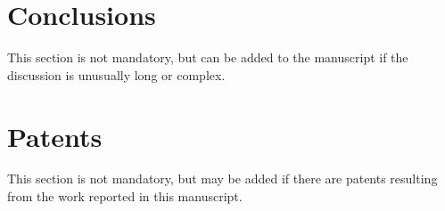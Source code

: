 \documentclass[journal,article,submit,pdftex,moreauthors]{Definitions/mdpi}
\begin{document}
\begin{itemize}
\section{Conclusions}

This section is not mandatory, but can be added to the manuscript if the discussion is unusually long or complex.

\section{Patents}

This section is not mandatory, but may be added if there are patents resulting from the work reported in this manuscript.

\vspace{6pt} 






\end{itemize}
\end{document}
